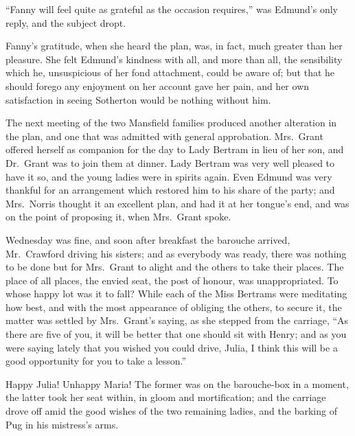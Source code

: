 ``Fanny will feel quite as grateful as the occasion requires,''
was Edmund's only reply, and the subject dropt.

Fanny's gratitude, when she heard the plan, was, in fact,
much greater than her pleasure.  She felt Edmund's kindness
with all, and more than all, the sensibility which he,
unsuspicious of her fond attachment, could be aware of;
but that he should forego any enjoyment on her account gave
her pain, and her own satisfaction in seeing Sotherton would
be nothing without him.

The next meeting of the two Mansfield families produced
another alteration in the plan, and one that was admitted
with general approbation.  Mrs.\ Grant offered herself as
companion for the day to Lady Bertram in lieu of her son,
and Dr.\ Grant was to join them at dinner.  Lady Bertram
was very well pleased to have it so, and the young ladies
were in spirits again.  Even Edmund was very thankful for an
arrangement which restored him to his share of the party;
and Mrs.\ Norris thought it an excellent plan, and had it
at her tongue's end, and was on the point of proposing it,
when Mrs.\ Grant spoke.

Wednesday was fine, and soon after breakfast the barouche
arrived, Mr.\ Crawford driving his sisters; and as everybody
was ready, there was nothing to be done but for Mrs.\ Grant
to alight and the others to take their places.  The place
of all places, the envied seat, the post of honour,
was unappropriated.  To whose happy lot was it to fall?
While each of the Miss Bertrams were meditating how best,
and with the most appearance of obliging the others,
to secure it, the matter was settled by Mrs.\ Grant's saying,
as she stepped from the carriage, ``As there are five
of you, it will be better that one should sit with Henry;
and as you were saying lately that you wished you
could drive, Julia, I think this will be a good opportunity
for you to take a lesson.''

Happy Julia!  Unhappy Maria!  The former was on the
barouche-box in a moment, the latter took her seat within,
in gloom and mortification; and the carriage drove
off amid the good wishes of the two remaining ladies,
and the barking of Pug in his mistress's arms.

